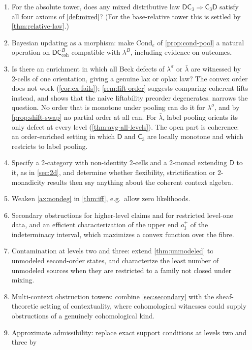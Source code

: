 \documentclass[11pt]{article}
\theoremstyle{definition}
\theoremstyle{remark}
\newcommand{\D}{\mathsf{D}}
\newcommand{\Cond}{\mathrm{Cond}}
\newcommand{\C}{\mathsf{C}}
\newcommand{\lb}{\bar\lambda}
\newcommand{\ls}{\lambda^{\sigma}}
\begin{document}
\begin{enumerate}[leftmargin=*]
\item For the absolute tower, does any mixed distributive law $\D\C_3\Rightarrow\C_3\D$ satisfy
  all four axioms of \cref{def:mixed}? (For the base-relative tower this is settled by
  \cref{thm:relative-law}.)
\item Bayesian updating as a morphism: make $\Cond_e$ of \cref{prop:cond-pool} a natural operation
  on $\D\C^B_{\mathrm{coh}}$ compatible with $\lambda^B$, including evidence on outcomes.
\item Is there an enrichment in which all Beck defects of $\ls$ or $\lb$ are witnessed by 2-cells of
  one orientation, giving a genuine lax or oplax law? The convex order does not work
  (\cref{cor:cx-fails}); \cref{rem:lift-order} suggests comparing coherent lifts instead, and shows
  that the naive liftability preorder degenerates.  narrows the question. No order that is monotone under
  pooling can do it for $\ls$, and by \cref{prop:shift-swap} no partial order at all can. For $\lb$, label pooling orients its only
  defect at every level (\cref{thm:avg-all-levels}). The open part is coherence: an order-enriched setting in which $\D$ and $\C_3$
  are locally monotone and which restricts to label pooling.
\item Specify a 2-category with non-identity 2-cells and a 2-monad extending $\D$ to it, as in
  \cref{sec:2d}, and determine whether flexibility, strictification or 2-monadicity results then say
  anything about the coherent context algebra.
\item Weaken \cref{ax:nondeg} in \cref{thm:iff}, e.g.\ allow zero likelihoods.
\item Secondary obstructions for higher-level claims and for restricted level-one data, and an
  efficient characterization of the upper end $o_3^+$ of the indeterminacy interval, which maximizes a
  convex function over the fibre.
\item Contamination at levels two and three: extend \cref{thm:unmodeled} to unmodeled second-order
  states, and characterize the least number of unmodeled sources when they are restricted to a
  family not closed under mixing.
\item Multi-context obstruction towers: combine \cref{sec:secondary} with the sheaf-theoretic
  setting of contextuality, where cohomological witnesses \cite{AbramskyMansfieldBarbosa2012} could
  supply obstructions of a genuinely cohomological kind.
\item Approximate admissibility: replace exact support conditions at levels two and three by

\end{enumerate}
\end{document}
